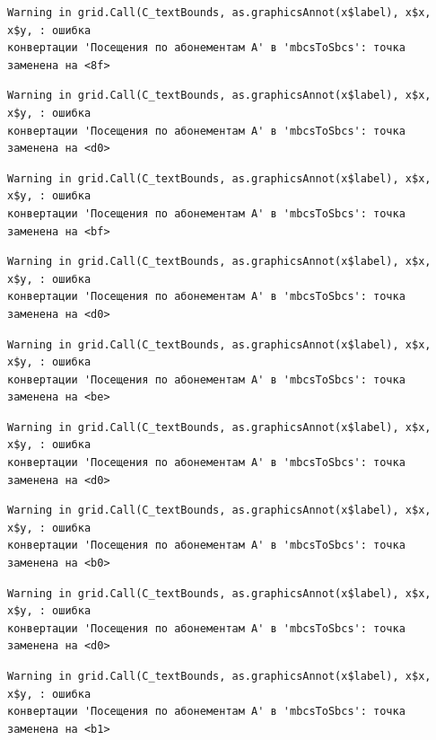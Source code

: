 \documentclass[
  letterpaper,
  DIV=11,
  numbers=noendperiod]{scrreprt}
\begin{document}
\begin{verbatim}
Warning in grid.Call(C_textBounds, as.graphicsAnnot(x$label), x$x, x$y, : ошибка
конвертации 'Посещения по абонементам А' в 'mbcsToSbcs': точка заменена на <8f>
\end{verbatim}

\begin{verbatim}
Warning in grid.Call(C_textBounds, as.graphicsAnnot(x$label), x$x, x$y, : ошибка
конвертации 'Посещения по абонементам А' в 'mbcsToSbcs': точка заменена на <d0>
\end{verbatim}

\begin{verbatim}
Warning in grid.Call(C_textBounds, as.graphicsAnnot(x$label), x$x, x$y, : ошибка
конвертации 'Посещения по абонементам А' в 'mbcsToSbcs': точка заменена на <bf>
\end{verbatim}

\begin{verbatim}
Warning in grid.Call(C_textBounds, as.graphicsAnnot(x$label), x$x, x$y, : ошибка
конвертации 'Посещения по абонементам А' в 'mbcsToSbcs': точка заменена на <d0>
\end{verbatim}

\begin{verbatim}
Warning in grid.Call(C_textBounds, as.graphicsAnnot(x$label), x$x, x$y, : ошибка
конвертации 'Посещения по абонементам А' в 'mbcsToSbcs': точка заменена на <be>
\end{verbatim}

\begin{verbatim}
Warning in grid.Call(C_textBounds, as.graphicsAnnot(x$label), x$x, x$y, : ошибка
конвертации 'Посещения по абонементам А' в 'mbcsToSbcs': точка заменена на <d0>
\end{verbatim}

\begin{verbatim}
Warning in grid.Call(C_textBounds, as.graphicsAnnot(x$label), x$x, x$y, : ошибка
конвертации 'Посещения по абонементам А' в 'mbcsToSbcs': точка заменена на <b0>
\end{verbatim}

\begin{verbatim}
Warning in grid.Call(C_textBounds, as.graphicsAnnot(x$label), x$x, x$y, : ошибка
конвертации 'Посещения по абонементам А' в 'mbcsToSbcs': точка заменена на <d0>
\end{verbatim}

\begin{verbatim}
Warning in grid.Call(C_textBounds, as.graphicsAnnot(x$label), x$x, x$y, : ошибка
конвертации 'Посещения по абонементам А' в 'mbcsToSbcs': точка заменена на <b1>
\end{verbatim}
\end{document}
